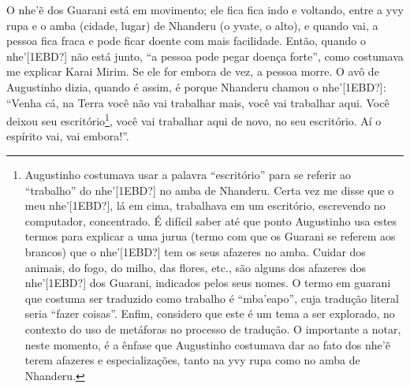 \documentclass{article}
\begin{document}
O nhe{\textquoteright}\~{e} dos Guarani est\'a em movimento; ele fica
fica indo e voltando, entre a yvy rupa e o amba (cidade, lugar) de
Nhanderu (o yvate, o alto), e quando vai, a pessoa fica fraca e pode
ficar doente com mais facilidade. Ent\~ao, quando o
nhe{\textquoteright}[1EBD?] n\~ao est\'a junto, {\textquotedblleft}a
pessoa pode pegar doen\c{c}a forte{\textquotedblright}, como costumava
me explicar Karai Mirim. Se ele for embora de vez, a pessoa morre. O
av\^o de Augustinho dizia, quando \'e assim, \'e porque Nhanderu chamou
o nhe{\textquoteright}[1EBD?]: {\textquotedblleft}Venha c\'a, na Terra
voc\^e n\~ao vai trabalhar mais, voc\^e vai trabalhar aqui. Voc\^e
deixou seu escrit\'orio\footnote{ Augustinho costumava usar a palavra
{\textquotedblleft}escrit\'orio{\textquotedblright} para se referir ao
{\textquotedblleft}trabalho{\textquotedblright} do
nhe{\textquoteright}[1EBD?] no amba de Nhanderu. Certa vez me disse que
o meu nhe{\textquoteright}[1EBD?], l\'a em cima, trabalhava em um
escrit\'orio, escrevendo no computador, concentrado. \'E dif\'icil
saber at\'e que ponto Augustinho usa estes termos para explicar a uma
jurua (termo com que os Guarani se referem aos brancos) que o
nhe{\textquoteright}[1EBD?] tem os seus afazeres no amba. Cuidar dos
animais, do fogo, do milho, das flores, etc., s\~ao alguns dos afazeres
dos nhe{\textquoteright}[1EBD?] dos Guarani, indicados pelos seus
nomes. O termo em guarani que costuma ser traduzido como trabalho \'e
{\textquotedblleft}mba{\textquoteright}eapo{\textquotedblright}, cuja
tradu\c{c}\~ao literal seria {\textquotedblleft}fazer
coisas{\textquotedblright}. Enfim, considero que este \'e um tema a ser
explorado, no contexto do uso de met\'aforas no processo de
tradu\c{c}\~ao. O importante a notar, neste momento, \'e a \^enfase que
Augustinho costumava dar ao fato dos nhe{\textquoteright}\~{e} terem
afazeres e especializa\c{c}\~oes, tanto na yvy rupa como no amba de
Nhanderu. }, voc\^e vai trabalhar aqui de novo, no seu escrit\'orio.
A\'i o esp\'irito vai, vai embora!{\textquotedblright}.
\end{document}
